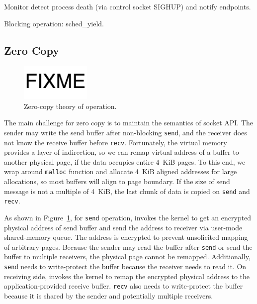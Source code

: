 Monitor detect process death (via control socket SIGHUP) and notify endpoints.

Blocking operation: sched\_yield.


\subsection{Zero Copy}
\label{subsec:zerocopy}

\begin{figure}[t]
	\centering
	\includegraphics[width=0.3\textwidth]{images/fixme}
	\caption{Zero-copy theory of operation.}
	\label{fig:zerocopy}
\end{figure}

The main challenge for zero copy is to maintain the semantics of socket API. The sender may write the send buffer after non-blocking \texttt{send}, and the receiver does not know the receive buffer before \texttt{recv}.
Fortunately, the virtual memory provides a layer of indirection, so we can remap virtual address of a buffer to another physical page, if the data occupies entire 4~KiB pages.
To this end, we wrap around \texttt{malloc} function and allocate 4~KiB aligned addresses for large allocations, so most buffers will align to page boundary.
If the size of send message is not a multiple of 4~KiB, the last chunk of data is copied on \texttt{send} and \texttt{recv}.

As shown in Figure~\ref{fig:zerocopy}, for \texttt{send} operation, \libipc{} invokes the kernel to get an encrypted physical address of send buffer and send the address to receiver via user-mode shared-memory queue.
The address is encrypted to prevent unsolicited mapping of arbitrary pages.
Because the sender may read the buffer after \texttt{send} or send the buffer to multiple receivers, the physical page cannot be remapped.
Additionally, \texttt{send} needs to write-protect the buffer because the receiver needs to read it.
On receiving side, \libipc{} invokes the kernel to remap the encrypted physical address to the application-provided receive buffer.
\texttt{recv} also needs to write-protect the buffer because it is shared by the sender and potentially multiple receivers.

